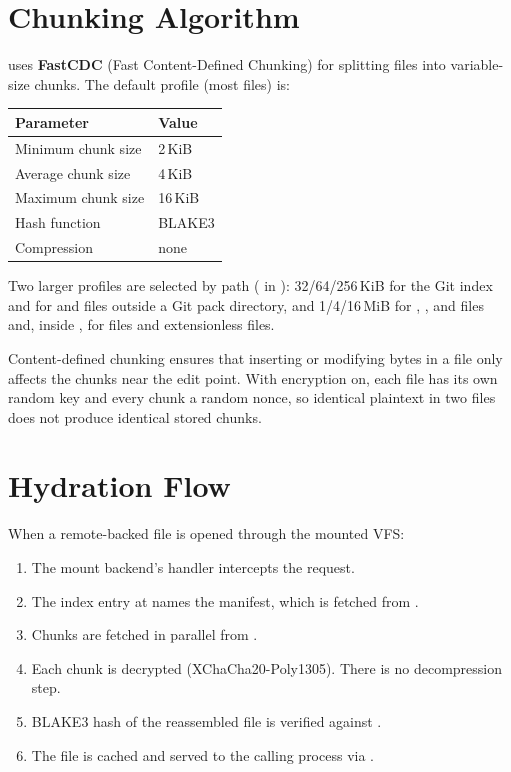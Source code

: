 \documentclass[11pt,a4paper]{article}
\begin{document}
\section{Chunking Algorithm}

\tcfs{} uses \textbf{FastCDC} (Fast Content-Defined Chunking) for splitting
files into variable-size chunks. The default profile (most files) is:

\begin{longtable}{ll}
  \toprule
  \textbf{Parameter} & \textbf{Value} \\
  \midrule
  Minimum chunk size & 2\,KiB \\
  Average chunk size & 4\,KiB \\
  Maximum chunk size & 16\,KiB \\
  Hash function      & BLAKE3 \\
  Compression        & none \\
  \bottomrule
\end{longtable}

Two larger profiles are selected by path ( in
): 32/64/256\,KiB for the Git
index and for  and  files outside a Git pack
directory, and 1/4/16\,MiB for , ,  and
 files and, inside , for 
files and extensionless  files.

Content-defined chunking ensures that inserting or modifying bytes in a file
only affects the chunks near the edit point. With encryption on, each file
has its own random key and every chunk a random nonce, so identical plaintext
in two files does not produce identical stored chunks.

\section{Hydration Flow}

When a remote-backed file is opened through the mounted VFS:

\begin{enumerate}
  \item The mount backend's  handler intercepts the request.
  \item The index entry at  names the
        manifest, which is fetched from
        .
  \item Chunks are fetched in parallel from
        .
  \item Each chunk is decrypted (XChaCha20-Poly1305). There is no
        decompression step.
  \item BLAKE3 hash of the reassembled file is verified against .
  \item The file is cached and served to the calling process via .
\end{enumerate}
\end{document}
